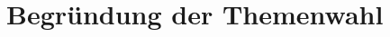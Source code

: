 \documentclass[../Mappe.tex]{subfiles}
\begin{document}
\section*{Begründung der Themenwahl}
\end{document}
